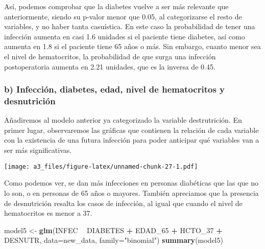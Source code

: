 \documentclass[]{article}
\newenvironment{Shaded}{\begin{snugshade}}{\end{snugshade}}
\newcommand{\DataTypeTok}[1]{\textcolor[rgb]{0.13,0.29,0.53}{#1}}
\newcommand{\DecValTok}[1]{\textcolor[rgb]{0.00,0.00,0.81}{#1}}
\newcommand{\KeywordTok}[1]{\textcolor[rgb]{0.13,0.29,0.53}{\textbf{#1}}}
\newcommand{\NormalTok}[1]{#1}
\newcommand{\OperatorTok}[1]{\textcolor[rgb]{0.81,0.36,0.00}{\textbf{#1}}}
\newcommand{\StringTok}[1]{\textcolor[rgb]{0.31,0.60,0.02}{#1}}
\begin{document}
Así, podemos comprobar que la diabetes vuelve a ser más relevante que
anteriormente, siendo su p-valor menor que 0.05, al categorizarse el
resto de variables, y no haber tanta casuística. En este caso la
probabilidad de tener una infección aumenta en casi 1.6 unidades si el
paciente tiene diabetes, así como aumenta en 1.8 si el paciente tiene 65
años o más. Sin embargo, cuanto menor sea el nivel de hematocritos, la
probabilidad de que surga una infección postoperatoria aumenta en 2.21
unidades, que es la inversa de 0.45.

\hypertarget{b-infecciuxf3n-diabetes-edad-nivel-de-hematocritos-y-desnutriciuxf3n}{%
\subsubsection{b) Infección, diabetes, edad, nivel de hematocritos y
desnutrición}\label{b-infecciuxf3n-diabetes-edad-nivel-de-hematocritos-y-desnutriciuxf3n}}

Añadiremos al modelo anterior ya categorizado la variable destrutrición.
En primer lugar, observaremos las gráficas que contienen la relación de
cada variable con la existencia de una futura infección para poder
anticipar qué variables van a ser más significativas.

\begin{Shaded}
\end{Shaded}

\texttt{[image: a3\_files/figure-latex/unnamed-chunk-27-1.pdf]}

Como podemos ver, se dan más infecciones en personas diabéticas que las
que no lo son, o en personas de 65 años o mayores. También apreciamos
que la presencia de desnutrición resalta los casos de infección, al
igual que cuando el nivel de hematocritos es menor a 37.

\begin{Shaded}
\begin{Highlighting}[]
\NormalTok{model5 <-}\StringTok{ }\KeywordTok{glm}\NormalTok{(INFEC }\OperatorTok{~}\StringTok{ }\NormalTok{DIABETES }\OperatorTok{+}\StringTok{ }\NormalTok{EDAD_}\DecValTok{65} \OperatorTok{+}\StringTok{ }\NormalTok{HCTO_}\DecValTok{37} \OperatorTok{+}\StringTok{ }\NormalTok{DESNUTR, }\DataTypeTok{data=}\NormalTok{new_data, }\DataTypeTok{family=}\StringTok{"binomial"}\NormalTok{)}
\KeywordTok{summary}\NormalTok{(model5)}
\end{Highlighting}
\end{Shaded}
\end{document}
